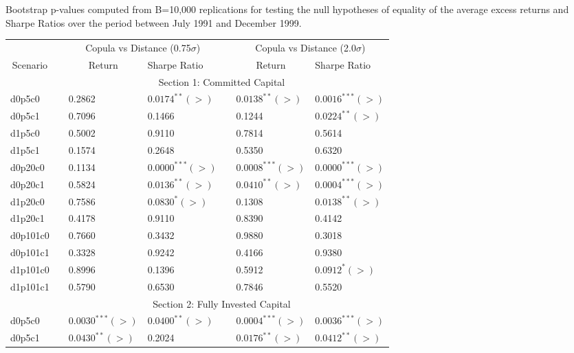 \documentclass[a4paper]{article}
\begin{document}
\begin{threeparttable}[H]
	\centering \scriptsize
	\caption{Bootstrap p-values computed from B=10,000 replications for testing the null hypotheses of equality of the average excess returns and Sharpe Ratios over the period between July 1991 and December 1999.}
	\begin{tabularx}{\textwidth}{@{\extracolsep{\fill}}lllllll@{}}
		\toprule
		& & \multicolumn{2}{c}{Copula vs Distance (0.75$\sigma$)} & \multicolumn{1}{c}{} & \multicolumn{2}{c}{Copula vs Distance (2.0$\sigma$)} \\
		\cmidrule{3-4}  \cmidrule{6-7}
		\multicolumn{1}{c}{Scenario} & & \multicolumn{1}{c}{Return} & Sharpe Ratio &       & \multicolumn{1}{c}{Return}& Sharpe Ratio \\
		\midrule
		& \multicolumn{6}{c}{Section 1: Committed Capital} \\
		\midrule
		d0p5c0 & & 0.2862 & $0.0174^{**}(>)$ &       & $0.0138^{**}(>)$ & $0.0016^{***}(>)$ \\
		d0p5c1 & & 0.7096 & 0.1466 &       & 0.1244 & $0.0224^{**}(>)$ \\
		d1p5c0 & & 0.5002 & 0.9110 &       & 0.7814 & 0.5614 \\
		d1p5c1 & & 0.1574 & 0.2648 &       & 0.5350 & 0.6320 \\
		d0p20c0 & & 0.1134 & $0.0000^{***}(>)$ &       & $0.0008^{***}(>)$ & $0.0000^{***}(>)$ \\
		d0p20c1 & & 0.5824 & $0.0136^{**}(>)$ &       & $0.0410^{**}(>)$ & $0.0004^{***}(>)$ \\
		d1p20c0 & & 0.7586 & $0.0830^{*}(>)$ &       & 0.1308 & $0.0138^{**}(>)$ \\
		d1p20c1 & & 0.4178 & 0.9110 &       & 0.8390 & 0.4142 \\
		d0p101c0 & & 0.7660 & 0.3432 &       & 0.9880 & 0.3018 \\
		d0p101c1 & & 0.3328 & 0.9242 &       & 0.4166 & 0.9380 \\
		d1p101c0 & & 0.8996 & 0.1396 &       & 0.5912 & $0.0912^{*}(>)$ \\
		d1p101c1 & & 0.5790 & 0.6530 &       & 0.7846 & 0.5520 \\
		\midrule
		& \multicolumn{6}{c}{Section 2:  Fully Invested Capital } \\
		\midrule
		d0p5c0 & & $0.0030^{***}(>)$ & $0.0400^{**}(>)$ &       & $0.0004^{***}(>)$ & $0.0036^{***}(>)$ \\
		d0p5c1 & & $0.0430^{**}(>)$ & 0.2024 &       & $0.0176^{**}(>)$ & $0.0412^{**}(>)$ \\

\end{tabularx}
\end{threeparttable}
\end{document}

